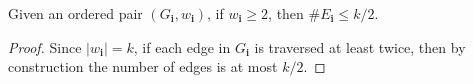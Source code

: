\begin{lemma}
  \label{lem:edge_set_order_leq_k_over_two}
  Given an ordered pair $(G_\mathbf{i},w_\mathbf{i})$, if $w_\mathbf{i} \geq 2$, then $\# E_\mathbf{i} \leq k/2$.
\end{lemma}
\begin{proof}
  Since $|w_\mathbf{i}| = k$, if each edge in $G_\mathbf{i}$ is traversed at least twice, then by construction the number of edges is at most $k/2$.
\end{proof}





